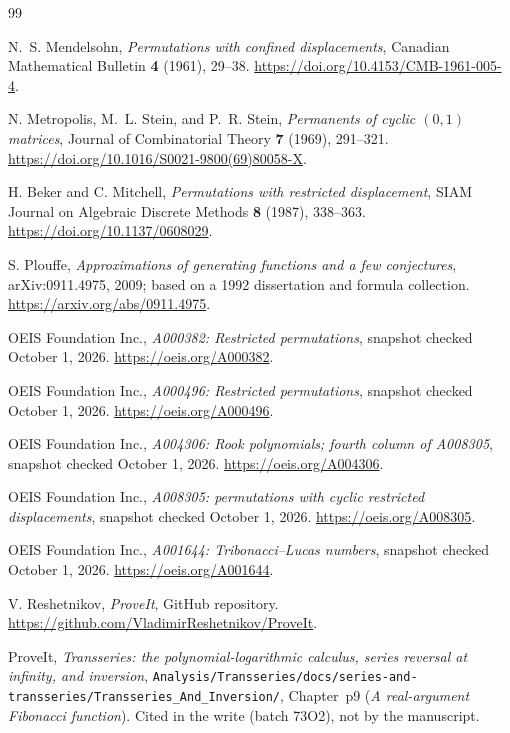 \documentclass[11pt,letterpaper]{article}
\numberwithin{equation}{section}
\theoremstyle{definition}
\begin{document}
\begin{thebibliography}{99}

N.~S. Mendelsohn,
\emph{Permutations with confined displacements},
Canadian Mathematical Bulletin \textbf{4} (1961), 29--38.
\url{https://doi.org/10.4153/CMB-1961-005-4}.

N. Metropolis, M.~L. Stein, and P.~R. Stein,
\emph{Permanents of cyclic $(0,1)$ matrices},
Journal of Combinatorial Theory \textbf{7} (1969), 291--321.
\url{https://doi.org/10.1016/S0021-9800(69)80058-X}.

H. Beker and C. Mitchell,
\emph{Permutations with restricted displacement},
SIAM Journal on Algebraic Discrete Methods \textbf{8} (1987), 338--363.
\url{https://doi.org/10.1137/0608029}.

S. Plouffe,
\emph{Approximations of generating functions and a few conjectures},
arXiv:0911.4975, 2009; based on a 1992 dissertation and formula collection.
\url{https://arxiv.org/abs/0911.4975}.

OEIS Foundation Inc.,
\emph{A000382: Restricted permutations}, snapshot checked October 1, 2026.
\url{https://oeis.org/A000382}.

OEIS Foundation Inc.,
\emph{A000496: Restricted permutations}, snapshot checked October 1, 2026.
\url{https://oeis.org/A000496}.

OEIS Foundation Inc.,
\emph{A004306: Rook polynomials; fourth column of A008305},
snapshot checked October 1, 2026.
\url{https://oeis.org/A004306}.

OEIS Foundation Inc.,
\emph{A008305: permutations with cyclic restricted displacements},
snapshot checked October 1, 2026.
\url{https://oeis.org/A008305}.

OEIS Foundation Inc.,
\emph{A001644: Tribonacci--Lucas numbers},
snapshot checked October 1, 2026.
\url{https://oeis.org/A001644}.

V. Reshetnikov,
\emph{ProveIt}, GitHub repository.
\url{https://github.com/VladimirReshetnikov/ProveIt}.

ProveIt, \emph{Transseries: the polynomial-logarithmic calculus, series
reversal at infinity, and inversion},
\nolinkurl{Analysis/Transseries/docs/series-and-transseries/Transseries_And_Inversion/},
Chapter~p9 (\emph{A real-argument Fibonacci function}). Cited in the write
(batch 73O2), not by the manuscript.

\end{thebibliography}
\end{document}
